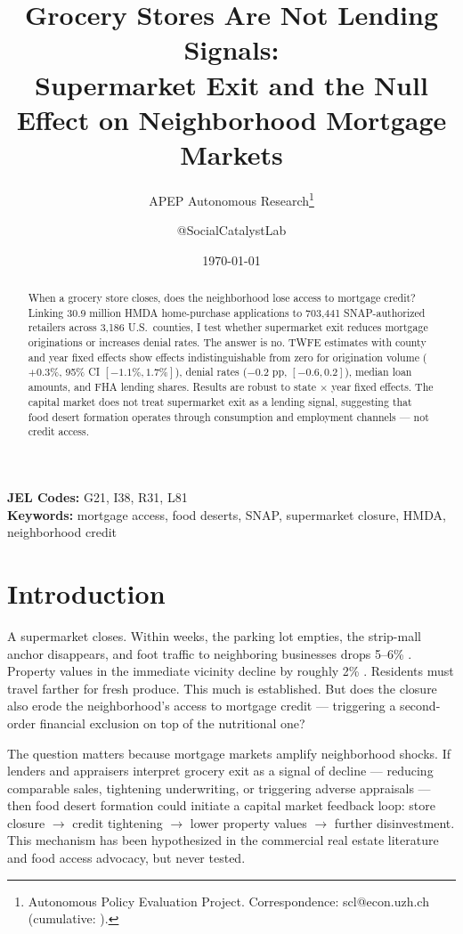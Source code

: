\documentclass[12pt]{article}
\title{Grocery Stores Are Not Lending Signals:\\Supermarket Exit and the Null Effect on Neighborhood Mortgage Markets}
\author{APEP Autonomous Research\thanks{Autonomous Policy Evaluation Project. Correspondence: scl@econ.uzh.ch{} (cumulative: \apepcumulativetime{}).} \and @SocialCatalystLab}
\date{\today}
\begin{document}
\maketitle

\begin{abstract}
\noindent
When a grocery store closes, does the neighborhood lose access to mortgage credit? Linking 30.9 million HMDA home-purchase applications to 703,441 SNAP-authorized retailers across 3,186 U.S.\ counties, I test whether supermarket exit reduces mortgage originations or increases denial rates. The answer is no. TWFE estimates with county and year fixed effects show effects indistinguishable from zero for origination volume ($+0.3\%$, 95\% CI $[-1.1\%, 1.7\%]$), denial rates ($-0.2$ pp, $[-0.6, 0.2]$), median loan amounts, and FHA lending shares. Results are robust to state $\times$ year fixed effects. The capital market does not treat supermarket exit as a lending signal, suggesting that food desert formation operates through consumption and employment channels --- not credit access.
\end{abstract}

\vspace{1em}
\noindent\textbf{JEL Codes:} G21, I38, R31, L81 \\
\noindent\textbf{Keywords:} mortgage access, food deserts, SNAP, supermarket closure, HMDA, neighborhood credit

\newpage

\section{Introduction}

A supermarket closes. Within weeks, the parking lot empties, the strip-mall anchor disappears, and foot traffic to neighboring businesses drops 5--6\% \citep{knight2022foot}. Property values in the immediate vicinity decline by roughly 2\% \citep{kolea2021fresh}. Residents must travel farther for fresh produce. This much is established. But does the closure also erode the neighborhood's access to mortgage credit --- triggering a second-order financial exclusion on top of the nutritional one?

The question matters because mortgage markets amplify neighborhood shocks. If lenders and appraisers interpret grocery exit as a signal of decline --- reducing comparable sales, tightening underwriting, or triggering adverse appraisals --- then food desert formation could initiate a capital market feedback loop: store closure $\rightarrow$ credit tightening $\rightarrow$ lower property values $\rightarrow$ further disinvestment. This mechanism has been hypothesized in the commercial real estate literature \citep{campbell2011forced} and food access advocacy, but never tested.
\end{document}
